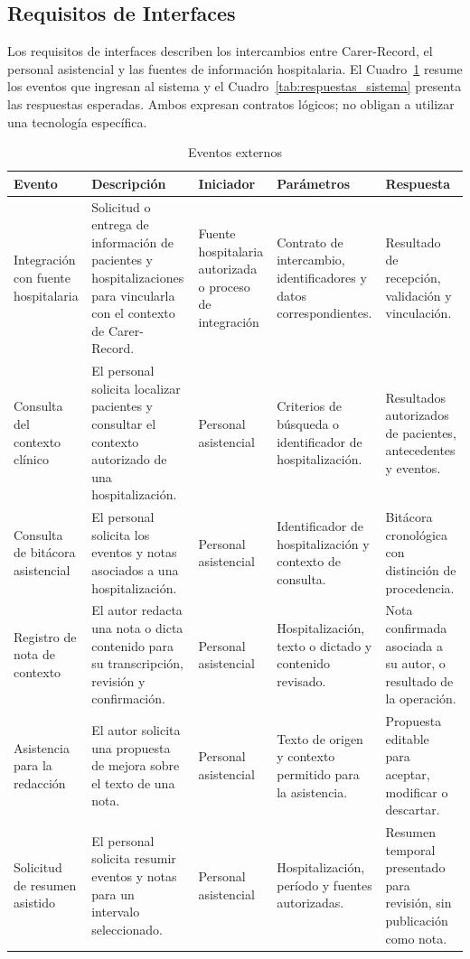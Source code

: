 \subsection{Requisitos de Interfaces}

Los requisitos de interfaces describen los intercambios entre Carer-Record, el personal asistencial y las fuentes de información hospitalaria. El Cuadro~\ref{tab:eventos_externos} resume los eventos que ingresan al sistema y el Cuadro~\ref{tab:respuestas_sistema} presenta las respuestas esperadas. Ambos expresan contratos lógicos; no obligan a utilizar una tecnología específica.

\begin{table}[H]
    \caption{Eventos externos}
    \label{tab:eventos_externos}
    \begin{tabularx}{\textwidth}{|l|X|X|X|X|}
        \hline
        \textbf{Evento} & \textbf{Descripción} & \textbf{Iniciador} & \textbf{Parámetros} & \textbf{Respuesta} \\
        \hline
        Integración con fuente hospitalaria & Solicitud o entrega de información de pacientes y hospitalizaciones para vincularla con el contexto de Carer-Record. & Fuente hospitalaria autorizada o proceso de integración & Contrato de intercambio, identificadores y datos correspondientes. & Resultado de recepción, validación y vinculación. \\
        \hline
        Consulta del contexto clínico & El personal solicita localizar pacientes y consultar el contexto autorizado de una hospitalización. & Personal asistencial & Criterios de búsqueda o identificador de hospitalización. & Resultados autorizados de pacientes, antecedentes y eventos. \\
        \hline
        Consulta de bitácora asistencial & El personal solicita los eventos y notas asociados a una hospitalización. & Personal asistencial & Identificador de hospitalización y contexto de consulta. & Bitácora cronológica con distinción de procedencia. \\
        \hline
        Registro de nota de contexto & El autor redacta una nota o dicta contenido para su transcripción, revisión y confirmación. & Personal asistencial & Hospitalización, texto o dictado y contenido revisado. & Nota confirmada asociada a su autor, o resultado de la operación. \\
        \hline
        Asistencia para la redacción & El autor solicita una propuesta de mejora sobre el texto de una nota. & Personal asistencial & Texto de origen y contexto permitido para la asistencia. & Propuesta editable para aceptar, modificar o descartar. \\
        \hline
        Solicitud de resumen asistido & El personal solicita resumir eventos y notas para un intervalo seleccionado. & Personal asistencial & Hospitalización, período y fuentes autorizadas. & Resumen temporal presentado para revisión, sin publicación como nota. \\
        \hline
    \end{tabularx}
\end{table}

